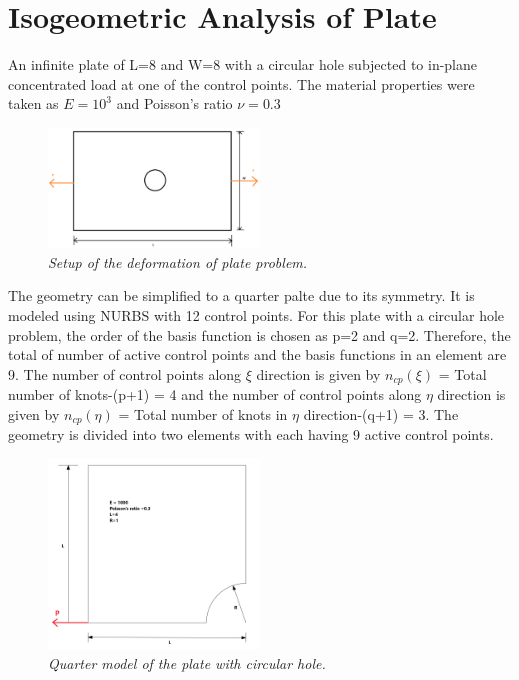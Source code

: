 \documentclass[submit,12pt]{aiaa-pretty} %
\begin{document}
\section{Isogeometric Analysis of Plate}
An infinite plate of L=8 and W=8 with a circular hole subjected to in-plane concentrated load at one of the control points. The material properties were taken as $E = 10^3$ and Poisson's ratio $\nu =0.3$
\begin{figure}[h] 
  \centering
  \includegraphics[width=0.5\textwidth]{figures/plate1.PNG} 
  \caption{\emph{Setup of the deformation of plate problem.}}
  \label{fig:plate-setup}
\end{figure}
The geometry can be simplified to a quarter palte due to its symmetry. It is modeled using NURBS with 12 control points. For this plate with a circular hole problem, the order of the basis function is chosen as p=2 and q=2. Therefore, the total of number of active control points and the basis functions in an element are 9. The number of control points along $\xi$ direction is given by $n_{cp}(\xi)$ = Total number of knots-(p+1) = 4 and the number of control points along $\eta$ direction is given by $n_{cp}(\eta)$ = Total number of knots in $\eta$ direction-(q+1) = 3. The geometry is divided into two elements with each having 9 active control points. 
\begin{figure}[h] 
  \centering
  \includegraphics[width=0.5\textwidth]{figures/plate2.png} 
  \caption{\emph{Quarter model of the plate with circular hole.}}
  \label{fig:plate-setup}
\end{figure}
\end{document}
